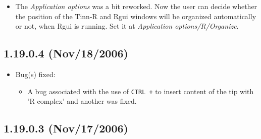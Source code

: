 \begin{itemize}
  \item The \textit{Application options} was a bit reworked. Now the user can
    decide whether the position of the Tinn-R and Rgui windows will be organized
    automatically or not, when Rgui is running. Set it at \textit{Application
      options/R/Organize}.
\end{itemize}


\subsection{1.19.0.4 (Nov/18/2006)}

\begin{itemize}
  \item Bug(s) fixed:
    \begin{itemize}
      \item A bug associated with the use of \texttt{CTRL +} to insert content of
        the tip with 'R complex' and another was fixed.
    \end{itemize}
\end{itemize}


\subsection{1.19.0.3 (Nov/17/2006)}

